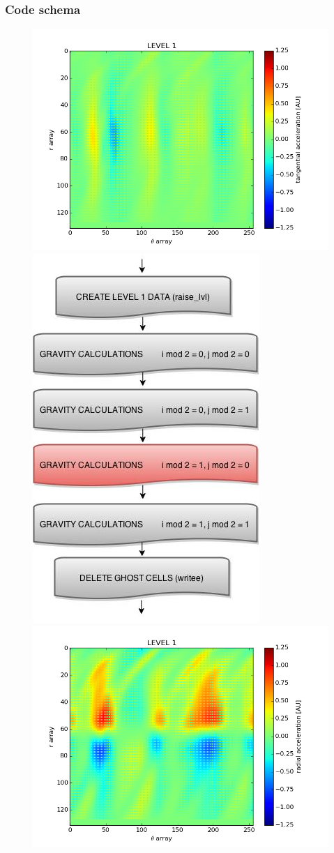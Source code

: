\documentclass{beamer}
\begin{document}
\begin{frame}
\frametitle{Code schema}

\begin{figure}

\includegraphics[width = .4\textwidth]{./level1_3_tangential.png}
\includegraphics[width = .2\textwidth]{./Grav_Diagram3.jpg}
\includegraphics[width = .4\textwidth]{./level1_3_radial.png}
\end{figure}

\end{frame}
\end{document}
